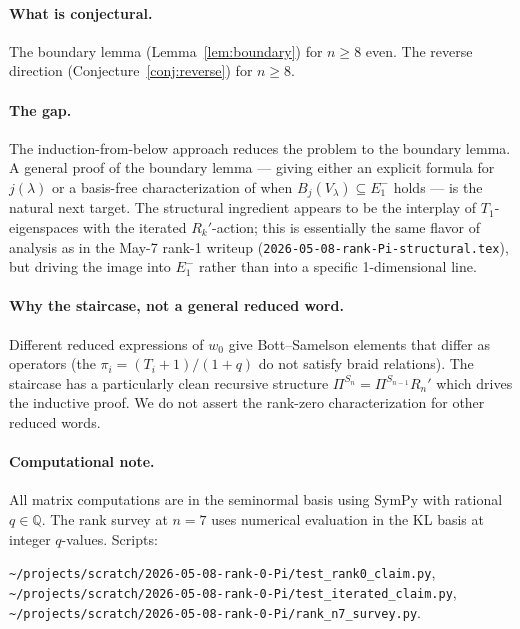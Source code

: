 \documentclass[11pt]{article}
\theoremstyle{definition}
\begin{document}
\paragraph{What is conjectural.}
The boundary lemma (Lemma~\ref{lem:boundary}) for $n\ge 8$ even.
The reverse direction (Conjecture~\ref{conj:reverse}) for $n\ge 8$.

\paragraph{The gap.}
The induction-from-below approach reduces the problem to the
boundary lemma. A general proof of the boundary lemma --- giving
either an explicit formula for $j(\lambda)$ or a basis-free
characterization of when $B_j(V_\lambda)\subseteq E_1^-$ holds ---
is the natural next target. The structural ingredient appears to
be the interplay of $T_1$-eigenspaces with the iterated
$R_k'$-action; this is essentially the same flavor of analysis
as in the May-7 rank-1 writeup (\texttt{2026-05-08-rank-Pi-structural.tex}),
but driving the image into $E_1^-$ rather than into a specific
1-dimensional line.

\paragraph{Why the staircase, not a general reduced word.}
Different reduced expressions of $w_0$ give Bott--Samelson
elements that differ as operators (the $\pi_i=(T_i+1)/(1+q)$ do
not satisfy braid relations). The staircase has a particularly
clean recursive structure $\Pi^{S_n}=\Pi^{S_{n-1}}R_n'$ which
drives the inductive proof. We do not assert the rank-zero
characterization for other reduced words.

\paragraph{Computational note.}
All matrix computations are in the seminormal basis using SymPy
with rational $q\in\mathbb{Q}$. The rank survey at $n=7$ uses
numerical evaluation in the KL basis at integer $q$-values. Scripts:
\begin{center}
\texttt{\textasciitilde/projects/scratch/2026-05-08-rank-0-Pi/test\_rank0\_claim.py},\\
\texttt{\textasciitilde/projects/scratch/2026-05-08-rank-0-Pi/test\_iterated\_claim.py},\\
\texttt{\textasciitilde/projects/scratch/2026-05-08-rank-0-Pi/rank\_n7\_survey.py}.
\end{center}
\end{document}
